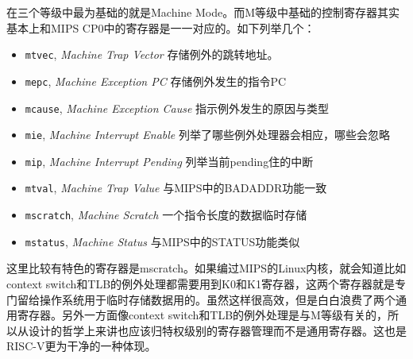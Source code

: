 \documentclass{article}
\begin{document}
\begin{enumerate}
	在三个等级中最为基础的就是Machine Mode。而M等级中基础的控制寄存器其实基本上和MIPS CP0中的寄存器是一一对应的。如下列举几个：~\cite{privileged}
	\begin{itemize}
		\item {\tt mtvec}, \textit{Machine Trap Vector} 存储例外的跳转地址。
		\item {\tt mepc}, \textit{Machine Exception PC} 存储例外发生的指令PC
		\item {\tt mcause}, \textit{Machine Exception Cause} 指示例外发生的原因与类型
		\item {\tt mie}, \textit{Machine Interrupt Enable} 列举了哪些例外处理器会相应，哪些会忽略
		\item {\tt mip}, \textit{Machine Interrupt Pending} 列举当前pending住的中断
		\item {\tt mtval}, \textit{Machine Trap Value} 与MIPS中的BADADDR功能一致
		\item {\tt mscratch}, \textit{Machine Scratch} 一个指令长度的数据临时存储
		\item {\tt mstatus}, \textit{Machine Status}
		与MIPS中的STATUS功能类似
	\end{itemize}
	这里比较有特色的寄存器是mscratch。如果编过MIPS的Linux内核，就会知道比如context switch和TLB的例外处理都需要用到K0和K1寄存器，这两个寄存器就是专门留给操作系统用于临时存储数据用的。虽然这样很高效，但是白白浪费了两个通用寄存器。另外一方面像context switch和TLB的例外处理是与M等级有关的，所以从设计的哲学上来讲也应该归特权级别的寄存器管理而不是通用寄存器。这也是RISC-V更为干净的一种体现。
	

\end{enumerate}
\end{document}
